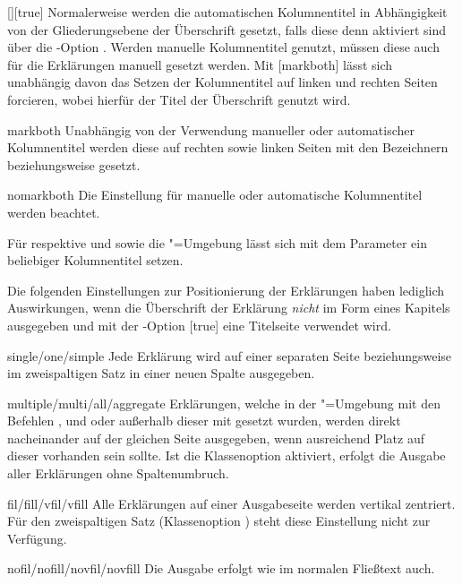 \begin{Declaration*}{}
\begin{Declaration*}{}
\begin{Declaration*}{}
\begin{Declaration}{[\PSet]}[true]
%
Normalerweise werden die automatischen Kolumnentitel in Abhängigkeit von der 
Gliederungsebene der Überschrift gesetzt, falls diese denn aktiviert sind über 
die \KOMAScript-Option . Werden manuelle Kolumnentitel 
genutzt, müssen diese auch für die Erklärungen manuell gesetzt werden. Mit 
[markboth] lässt sich unabhängig davon das Setzen der 
Kolumnentitel auf linken und rechten Seiten forcieren, wobei hierfür der Titel 
der Überschrift genutzt wird.
%
\begin{values}
\item[markboth]
  Unabhängig von der Verwendung manueller oder automatischer Kolumnentitel 
  werden diese auf rechten sowie linken Seiten mit den Bezeichnern 
   beziehungsweise  gesetzt.
\item[nomarkboth]
  Die Einstellung für manuelle oder automatische Kolumnentitel werden beachtet.
\end{values}
%
Für  respektive  und  
sowie die "=Umgebung lässt sich mit dem Parameter 
 ein beliebiger Kolumnentitel setzen. 

Die folgenden Einstellungen zur Positionierung der Erklärungen haben lediglich 
Auswirkungen, wenn die Überschrift der Erklärung \emph{nicht} im Form eines 
Kapitels ausgegeben und mit der \KOMAScript-Option [true] 
eine Titelseite verwendet wird.
%
\begin{values}
\item[single/one/simple]
  Jede Erklärung wird auf einer separaten Seite
  beziehungsweise im zweispaltigen Satz in einer neuen Spalte ausgegeben.
\item[multiple/multi/all/aggregate]
  Erklärungen, welche in der "=Umgebung mit den 
  Befehlen ,  und  oder 
  außerhalb dieser mit  gesetzt wurden, werden direkt 
  nacheinander auf der gleichen Seite ausgegeben, wenn ausreichend Platz auf 
  dieser vorhanden sein sollte. Ist die Klassenoption  
  aktiviert, erfolgt die Ausgabe aller Erklärungen ohne Spaltenumbruch.
\item[fil/fill/vfil/vfill]
  Alle Erklärungen auf einer Ausgabeseite werden vertikal zentriert. Für 
  den zweispaltigen Satz (Klassenoption ) steht diese 
  Einstellung nicht zur Verfügung.
\item[nofil/nofill/novfil/novfill]
  Die Ausgabe erfolgt wie im normalen Fließtext auch.
\end{values}
\end{Declaration}


\end{Declaration*}
\end{Declaration*}
\end{Declaration*}
